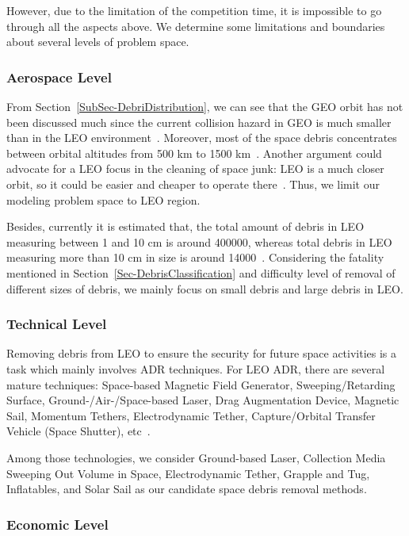 \documentclass{mcmthesis}
\begin{document}
	However, due to the limitation of the competition time, it is impossible to go through all the aspects above. We determine some limitations and boundaries about several levels of problem space.
	
\subsubsection{Aerospace Level}
	
	From Section~\ref{SubSec-DebriDistribution}, we can see that the GEO orbit has not been discussed much since the current collision hazard in GEO is much smaller than in the	LEO environment~\cite{McKnight}. Moreover, most of the space debris concentrates between orbital altitudes from 500 km to 1500 km~\cite{Zhang}. Another argument could advocate for a LEO focus in the cleaning of space junk: LEO is a much closer orbit, so it could be easier and cheaper to operate there~\cite{Oliver}. Thus, we limit our modeling problem space to LEO region.
	
	Besides, currently it is estimated that, the total amount of debris in LEO measuring between 1 and 10 cm is around 400000, whereas total debris in LEO measuring more than 10 cm in size is around 14000~\cite{Jakhu}. Considering the fatality mentioned in Section~\ref{Sec-DebrisClassification} and difficulty level of removal of different sizes of debris, we mainly focus on small debris and large debris in LEO.
	
\subsubsection{Technical Level}
	
	Removing debris from LEO to ensure the security for future space activities is a task which mainly involves ADR techniques. For LEO ADR, there are several mature techniques: Space-based Magnetic Field Generator, Sweeping/Retarding Surface, Ground-/Air-/Space-based Laser, Drag Augmentation Device, Magnetic Sail, Momentum Tethers, Electrodynamic Tether, Capture/Orbital Transfer Vehicle (Space Shutter), etc~\cite{Zhang}.
	
	Among those technologies, we consider Ground-based Laser, Collection Media Sweeping Out Volume in Space, Electrodynamic Tether, Grapple and Tug, Inflatables, and Solar Sail as our candidate space debris removal methods.
	
	
\subsubsection{Economic Level}
	
\end{document}
